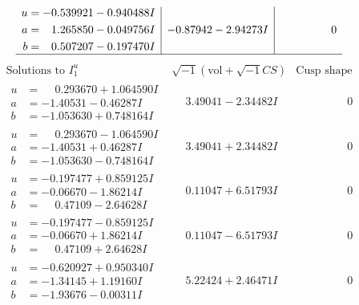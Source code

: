 \documentclass[1p]{elsarticle_modified}
\theoremstyle{definition}
\newcommand{\I}{\sqrt{-1}}
\begin{document}
$$\begin{array}{c|c|c}
\begin{aligned}
u &= -0.539921 - 0.940488 I \\
a &= \phantom{-}1.265850 - 0.049756 I \\
b &= \phantom{-}0.507207 - 0.197470 I\end{aligned}
 & -0.87942 - 2.94273 I & \phantom{-0.000000 } 0\\
 \hline 
 \end{array}$$\newpage$$\begin{array}{c|c|c}  
\text{Solutions to }I^u_{1}& \I (\text{vol} + \sqrt{-1}CS) & \text{Cusp shape}\\
 \hline 
\begin{aligned}
u &= \phantom{-}0.293670 + 1.064590 I \\
a &= -1.40531 - 0.46287 I \\
b &= -1.053630 + 0.748164 I\end{aligned}
 & \phantom{-}3.49041 - 2.34482 I & \phantom{-0.000000 } 0 \\ \hline\begin{aligned}
u &= \phantom{-}0.293670 - 1.064590 I \\
a &= -1.40531 + 0.46287 I \\
b &= -1.053630 - 0.748164 I\end{aligned}
 & \phantom{-}3.49041 + 2.34482 I & \phantom{-0.000000 } 0 \\ \hline\begin{aligned}
u &= -0.197477 + 0.859125 I \\
a &= -0.06670 - 1.86214 I \\
b &= \phantom{-}0.47109 - 2.64628 I\end{aligned}
 & \phantom{-}0.11047 + 6.51793 I & \phantom{-0.000000 } 0 \\ \hline\begin{aligned}
u &= -0.197477 - 0.859125 I \\
a &= -0.06670 + 1.86214 I \\
b &= \phantom{-}0.47109 + 2.64628 I\end{aligned}
 & \phantom{-}0.11047 - 6.51793 I & \phantom{-0.000000 } 0 \\ \hline\begin{aligned}
u &= -0.620927 + 0.950340 I \\
a &= -1.34145 + 1.19160 I \\
b &= -1.93676 - 0.00311 I\end{aligned}
 & \phantom{-}5.22424 + 2.46471 I & \phantom{-0.000000 } 0 \\ \hline\begin{aligned}

\end{aligned}
\end{array}$$
\end{document}

